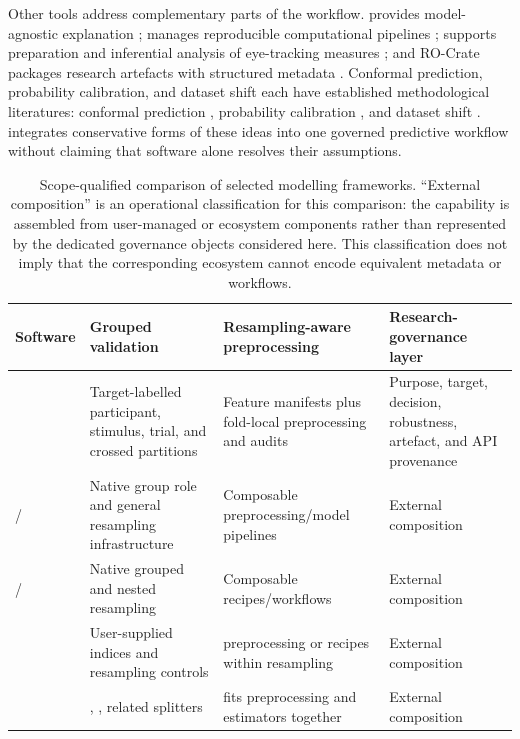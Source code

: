 \documentclass[article]{jss}
\begin{document}
Other tools address complementary parts of the workflow.  provides
model-agnostic explanation \citep{Biecek2018};  manages reproducible
computational pipelines \citep{Landau2021};  supports preparation and
inferential analysis of eye-tracking measures \citep{DinkFerguson2015}; and RO-Crate
packages research artefacts with structured metadata \citep{SoilandReyes2022}. Conformal
prediction, probability calibration, and dataset shift each have established
methodological literatures: conformal prediction
\citep{Vovk2005,Shafer2008,Angelopoulos2023}, probability calibration
\citep{Guo2017}, and dataset shift \citep{QuioneroCandela2009,MorenoTorres2012}.
 integrates conservative forms of these ideas into one governed predictive
workflow without claiming that software alone resolves their assumptions.

\begin{table}[t]
\centering
\caption{\label{tab:software}Scope-qualified comparison of selected modelling
frameworks. ``External composition'' is an operational classification for this comparison:
the capability is assembled from user-managed or ecosystem components rather than
represented by the dedicated  governance objects considered here. This
classification does not imply that the corresponding ecosystem cannot encode equivalent
metadata or workflows.}
\small
\begin{tabularx}{\textwidth}{@{}lYYY@{}}
\toprule
Software & Grouped validation & Resampling-aware preprocessing & Research-governance layer\\
\midrule
{} & Target-labelled participant, stimulus, trial, and crossed partitions &
Feature manifests plus fold-local preprocessing and audits &
Purpose, target, decision, robustness, artefact, and API provenance\\
/ & Native group role and general resampling infrastructure &
Composable preprocessing/model pipelines &
External composition\\
/ & Native grouped and nested resampling &
Composable recipes/workflows &
External composition\\
 & User-supplied indices and resampling controls \citep{caretDocs2026} &
 preprocessing or recipes within resampling &
External composition\\
 & , , related splitters &
 fits preprocessing and estimators together &
External composition\\
\bottomrule
\end{tabularx}
\end{table}
\end{document}
